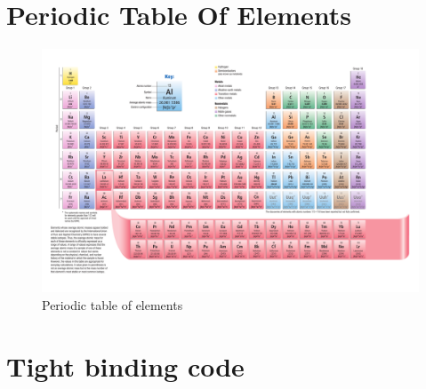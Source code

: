 \section{Periodic Table Of Elements}
	\begin{figure}[ht]
		\centering
	  \includegraphics[width=1\textwidth]{figures/Appendix/periodicTable.pdf}
		\caption{Periodic table of elements}
		\label{fig:periodicTable}
	\end{figure}

\section{Tight binding code}
	
	












